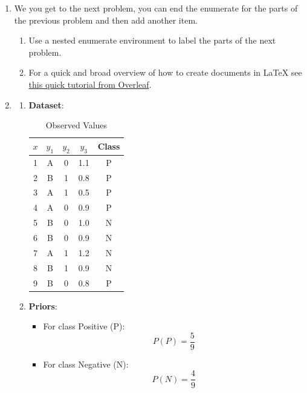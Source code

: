\documentclass{article}
\begin{document}
\begin{enumerate}[leftmargin=\labelsep]
\item We you get to the next problem, you can end the enumerate for the parts of the previous problem and then add another item.
    \begin{enumerate}
    \item Use a nested enumerate environment to label the parts of the next problem.
    \item For a quick and broad overview of how to create documents in {\LaTeX} see 
    \href{https://www.overleaf.com/learn/latex/Learn_LaTeX_in_30_minutes}{this quick tutorial from Overleaf}.
    \end{enumerate}

\item \begin{enumerate}
    \item \textbf{Dataset}:
    \begin{table}[h]
    \centering
    \begin{tabular}{ccccc}
    \toprule
    $x$ & $y_1$ & $y_2$ & $y_3$ & Class \\
    \midrule
    1 & A & 0 & 1.1 & P \\
    2 & B & 1 & 0.8 & P \\
    3 & A & 1 & 0.5 & P \\
    4 & A & 0 & 0.9 & P \\
    5 & B & 0 & 1.0 & N \\
    6 & B & 0 & 0.9 & N \\
    7 & A & 1 & 1.2 & N \\
    8 & B & 1 & 0.9 & N \\
    9 & B & 0 & 0.8 & P \\
    \bottomrule
    \end{tabular}
    \caption{Observed Values}
    \end{table}

    \item \textbf{Priors}:
    \begin{itemize}
        \item For class Positive (P):
        \[
        P(P) = \frac{5}{9}
        \]
        \item For class Negative (N):
        \[
        P(N) = \frac{4}{9}
        \]
    \end{itemize}


\end{enumerate}
\end{enumerate}
\end{document}
